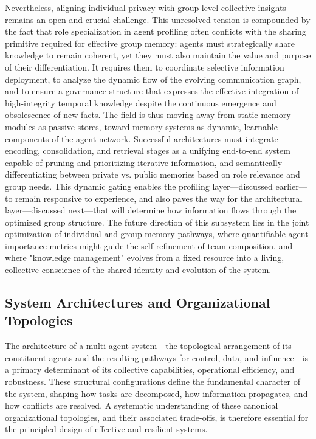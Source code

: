 \documentclass[11pt,a4paper]{article}
\begin{document}
Nevertheless, aligning individual privacy with group-level collective insights remains an open and crucial challenge. This unresolved tension is compounded by the fact that role specialization in agent profiling often conflicts with the sharing primitive required for effective group memory: agents must strategically share knowledge to remain coherent, yet they must also maintain the value and purpose of their differentiation. It requires them to coordinate selective information deployment, to analyze the dynamic flow of the evolving communication graph, and to ensure a governance structure that expresses the effective integration of high-integrity temporal knowledge despite the continuous emergence and obsolescence of new facts. The field is thus moving away from static memory modules as passive stores, toward memory systems as dynamic, learnable components of the agent network. Successful architectures must integrate encoding, consolidation, and retrieval stages as a unifying end-to-end system capable of pruning and prioritizing iterative information, and semantically differentiating between private vs. public memories based on role relevance and group needs. This dynamic gating enables the profiling layer---discussed earlier---to remain responsive to experience, and also paves the way for the architectural layer---discussed next---that will determine how information flows through the optimized group structure. The future direction of this subsystem lies in the joint optimization of individual and group memory pathways, where quantifiable agent importance metrics might guide the self-refinement of team composition, and where "knowledge management" evolves from a fixed resource into a living, collective conscience of the shared identity and evolution of the system.


\subsection{System Architectures and Organizational Topologies}


The architecture of a multi-agent system---the topological arrangement of its constituent agents and the resulting pathways for control, data, and influence---is a primary determinant of its collective capabilities, operational efficiency, and robustness. These structural configurations define the fundamental character of the system, shaping how tasks are decomposed, how information propagates, and how conflicts are resolved. A systematic understanding of these canonical organizational topologies, and their associated trade-offs, is therefore essential for the principled design of effective and resilient systems.
\end{document}
